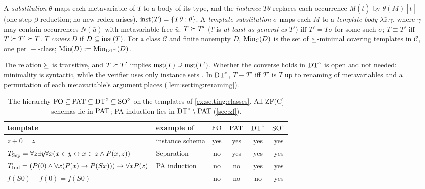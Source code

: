 \begin{definition}\label{def:setting:instances}
A \emph{substitution} $\theta$ maps each metavariable of $T$ to a body of its type, and the \emph{instance} $T\theta$ replaces each occurrence $M(\bar t)$ by $\theta(M)[\bar t]$ (one-step $\beta$-reduction; no new redex arises). $\mathrm{inst}(T)=\{T\theta:\theta\}$. A \emph{template substitution} $\sigma$ maps each $M$ to a \emph{template body} $\lambda\bar z.\gamma$, where $\gamma$ may contain occurrences $N(\bar u)$ with metavariable-free $\bar u$. $T\succeq T'$ ($T$ is \emph{at least as general as} $T'$) iff $T'=T\sigma$ for some such $\sigma$; $T\equiv T'$ iff $T\succeq T'\succeq T$. $T$ \emph{covers} $D$ if $D\subseteq\mathrm{inst}(T)$. For a class $\mathcal C$ and finite nonempty $D$, $\mathrm{Min}_{\mathcal C}(D)$ is the set of $\succeq$-minimal covering templates in $\mathcal C$, one per $\equiv$-class; $\mathrm{Min}(D):=\mathrm{Min}_{\mathrm{DT}^{\circ}}(D)$.
\end{definition}

The relation $\succeq$ is transitive, and $T\succeq T'$ implies $\mathrm{inst}(T)\supseteq\mathrm{inst}(T')$. Whether the converse holds in $\mathrm{DT}^{\circ}$ is open and not needed: minimality is syntactic, while the verifier uses only instance sets . In $\mathrm{DT}^{\circ}$, $T\equiv T'$ iff $T'$ is $T$ up to renaming of metavariables and a permutation of each metavariable's argument places (\cref{lem:setting:renaming}).

\begin{table}[t]
\centering\small
\begin{tabular}{@{}llcccc@{}}
\toprule
template & example of & $\mathrm{FO}$ & $\mathrm{PAT}$ & $\mathrm{DT}^{\circ}$ & $\mathrm{SO}^{\circ}$\\
\midrule
$z+0=z$ & instance schema & yes & yes & yes & yes\\
$T_{\mathrm{Sep}}=\forall z\exists y\forall x(x\in y\leftrightarrow x\in z\wedge P(x,z))$ & Separation & no & yes & yes & yes\\
$T_{\mathrm{Ind}}=(P(0)\wedge\forall x(P(x)\to P(Sx)))\to\forall xP(x)$ & PA induction & no & no & yes & yes\\
$f(S0)+f(0)=f(S0)$ & --- & no & no & no & yes\\
\bottomrule
\end{tabular}
\caption{The hierarchy $\mathrm{FO}\subseteq\mathrm{PAT}\subseteq\mathrm{DT}^{\circ}\subseteq\mathrm{SO}^{\circ}$ on the templates of \cref{ex:setting:classes}. All ZF(C) schemas lie in $\mathrm{PAT}$; PA induction lies in $\mathrm{DT}^{\circ}\setminus\mathrm{PAT}$ (\cref{sec:zf}).}
\label{tab:setting:classes}
\end{table}

